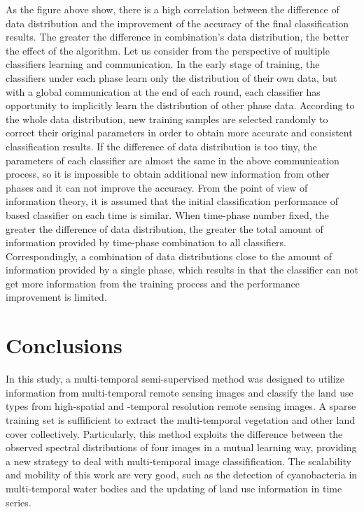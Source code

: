 \documentclass{isprs} %
\begin{document}
As the figure above show, there is a high correlation between the difference of data distribution and the improvement of the accuracy of the final classification results. The greater the difference in combination’s data distribution, the better the effect of the algorithm. Let us consider from the perspective of multiple classifiers learning and communication. In the early stage of training, the classifiers under each phase learn only the distribution of their own data, but with a global communication at the end of each round, each classifier has opportunity to implicitly learn the distribution of other phase data. According to the whole data distribution, new training samples are selected randomly to correct their original parameters in order to obtain more accurate and consistent classification results. If the difference of data distribution is too tiny, the parameters of each classifier are almost the same in the above communication process, so it is impossible to obtain additional new information from other phases and it can not improve the accuracy. From the point of view of information theory, it is assumed that the initial classification performance of  based classifier on each time is similar. When time-phase number fixed, the greater the difference of data distribution, the greater the total amount of information provided by time-phase combination to all classifiers. Correspondingly, a combination of data distributions close to the amount of information provided by a single phase, which results in that the classifier can not get more information from the training process and the performance improvement is limited.

\section{Conclusions}\label{sec:Conclusions}
In this study, a multi-temporal semi-supervised method was designed to utilize information from multi-temporal remote sensing images and classify the land use types from high-spatial and -temporal resolution remote sensing images. A sparse training set is suffificient to extract the multi-temporal vegetation and other land cover collectively. Particularly, this method exploits the difference between the observed spectral distributions of four images in a mutual learning way, providing a new strategy to deal with multi-temporal image classifification. The scalability and mobility of this work are very good, such as the detection of cyanobacteria in multi-temporal water bodies and the updating of land use information in time series.
\end{document}
